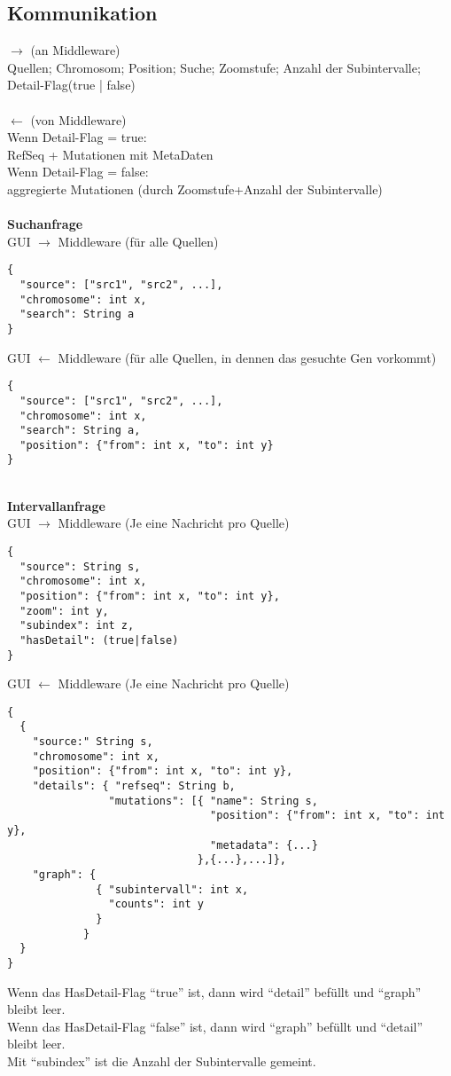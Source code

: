 \documentclass{scrartcl}
\begin{document}
\subsection{Kommunikation}
$\rightarrow$ (an Middleware)\\
Quellen; Chromosom; Position; Suche; Zoomstufe; Anzahl der Subintervalle;\\Detail-Flag(true | false)\\
\\
$\leftarrow$ (von Middleware)\\
Wenn Detail-Flag = true:\\
\hspace*{1cm} RefSeq + Mutationen mit MetaDaten\\
Wenn Detail-Flag = false:\\
\hspace*{1cm} aggregierte Mutationen (durch Zoomstufe+Anzahl der Subintervalle)\\
\\
\textbf{Suchanfrage}\\
GUI $\rightarrow$ Middleware (für alle Quellen)
\begin{lstlisting}
{
  "source": ["src1", "src2", ...],
  "chromosome": int x,
  "search": String a
}
\end{lstlisting}
GUI $\leftarrow$ Middleware (für alle Quellen, in dennen das gesuchte Gen vorkommt)
\begin{lstlisting}
{
  "source": ["src1", "src2", ...],
  "chromosome": int x,
  "search": String a,
  "position": {"from": int x, "to": int y}
}
\end{lstlisting}
\newpage\hfill\\
\textbf{Intervallanfrage}\\
GUI $\rightarrow$ Middleware (Je eine Nachricht pro Quelle)
\begin{lstlisting}
{
  "source": String s,
  "chromosome": int x,
  "position": {"from": int x, "to": int y},
  "zoom": int y,
  "subindex": int z,
  "hasDetail": (true|false)
}
\end{lstlisting}
GUI $\leftarrow$ Middleware (Je eine Nachricht pro Quelle)
\begin{lstlisting}
{
  {
    "source:" String s,
    "chromosome": int x,
    "position": {"from": int x, "to": int y},
    "details": { "refseq": String b,
                "mutations": [{ "name": String s,
                                "position": {"from": int x, "to": int y},
                                "metadata": {...}
                              },{...},...]},
    "graph": {
              { "subintervall": int x,
                "counts": int y
              }
            }
  }
}
\end{lstlisting}
Wenn das HasDetail-Flag \enquote{true} ist, dann wird \enquote{detail} befüllt und \enquote{graph} bleibt leer.\\
Wenn das HasDetail-Flag \enquote{false} ist, dann wird \enquote{graph} befüllt und \enquote{detail} bleibt leer.\\
Mit \enquote{subindex} ist die Anzahl der Subintervalle gemeint.
\newpage
\end{document}
